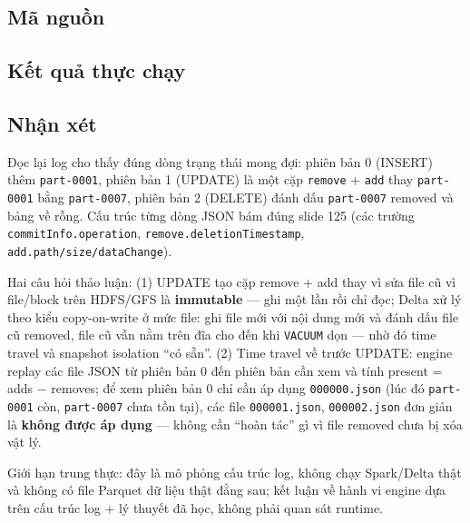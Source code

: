 \documentclass[12pt,a4paper,oneside]{article}
\begin{document}
\subsection{Mã nguồn}



\subsection{Kết quả thực chạy}



\subsection{Nhận xét}

Đọc lại log cho thấy đúng dòng trạng thái mong đợi: phiên bản 0 (INSERT) thêm \texttt{part-0001}, phiên bản 1 (UPDATE) là một cặp \texttt{remove} + \texttt{add} thay \texttt{part-0001} bằng \texttt{part-0007}, phiên bản 2 (DELETE) đánh dấu \texttt{part-0007} removed và bảng về rỗng. Cấu trúc từng dòng JSON bám đúng slide 125 (các trường \texttt{commitInfo.operation}, \texttt{remove.deletionTimestamp}, \texttt{add.path/size/dataChange}).

Hai câu hỏi thảo luận: (1) UPDATE tạo cặp remove + add thay vì sửa file cũ vì file/block trên HDFS/GFS là \textbf{immutable} --- ghi một lần rồi chỉ đọc; Delta xử lý theo kiểu copy-on-write ở mức file: ghi file mới với nội dung mới và đánh dấu file cũ removed, file cũ vẫn nằm trên đĩa cho đến khi \texttt{VACUUM} dọn --- nhờ đó time travel và snapshot isolation ``có sẵn''. (2) Time travel về trước UPDATE: engine replay các file JSON từ phiên bản 0 đến phiên bản cần xem và tính present = adds $-$ removes; để xem phiên bản 0 chỉ cần áp dụng \texttt{000000.json} (lúc đó \texttt{part-0001} còn, \texttt{part-0007} chưa tồn tại), các file \texttt{000001.json}, \texttt{000002.json} đơn giản là \textbf{không được áp dụng} --- không cần ``hoàn tác'' gì vì file removed chưa bị xóa vật lý.

Giới hạn trung thực: đây là mô phỏng cấu trúc log, không chạy Spark/Delta thật và không có file Parquet dữ liệu thật đằng sau; kết luận về hành vi engine dựa trên cấu trúc log + lý thuyết đã học, không phải quan sát runtime.
\end{document}
